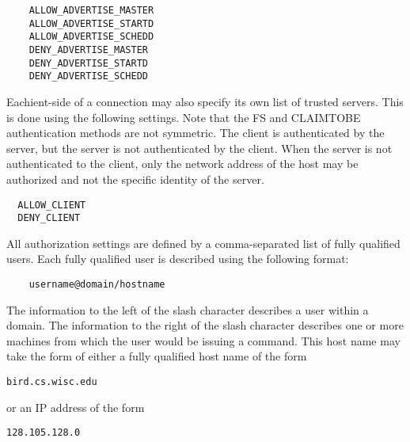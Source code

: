 \begin{verbatim}
    ALLOW_ADVERTISE_MASTER
    ALLOW_ADVERTISE_STARTD
    ALLOW_ADVERTISE_SCHEDD
    DENY_ADVERTISE_MASTER
    DENY_ADVERTISE_STARTD
    DENY_ADVERTISE_SCHEDD
\end{verbatim}


Eachient-side of a connection may also specify its own list of
trusted servers.  This is done using the following settings.  Note
that the FS and CLAIMTOBE authentication methods are not symmetric.
The client is authenticated by the server, but the server is not
authenticated by the client.  When the server is not authenticated to
the client, only the network address of the host may be authorized and
not the specific identity of the server.

\begin{verbatim}
  ALLOW_CLIENT
  DENY_CLIENT
\end{verbatim}
	
All authorization settings are defined by a comma-separated list of
fully qualified users.
Each fully qualified user
is described using the following format:
\begin{verbatim}
    username@domain/hostname
\end{verbatim}
The information to the left of the slash character describes
a user within a domain.
The information to the right of the slash character describes
one or more machines from which the user would be issuing a command. 
This host name may take the form of either a fully qualified host name
of the form
\begin{verbatim}
bird.cs.wisc.edu
\end{verbatim}
or an IP address
of the form
\begin{verbatim}
128.105.128.0
\end{verbatim}

